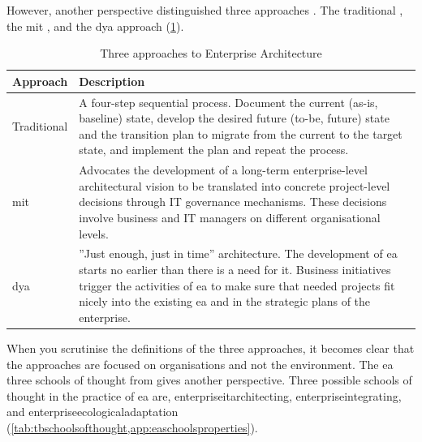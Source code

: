 However, another perspective distinguished three approaches \parencite[p.~4071]{Kotusev2015}. The traditional \parencite{Spewak1993}, the \acrfull{mit} \parencite{Ross2014}, and the \acrfull{dya} \parencite{Wagter2005} approach \parencite[pp.~4071--4072]{Kotusev2015} (\cref{tab:tbthreeapproaches}).
\begin{longtable}{p{}p{}}
	\toprule%
	\textbf{Approach} & \textbf{Description} \\%
	\midrule%
	\endhead%
	\hline
	\endfoot%
	\caption[Three approaches to Enterprise Architecture \parencite{Kotusev2015}]{Three approaches to Enterprise Architecture \parencite{Kotusev2015}}
	\label{tab:tbthreeapproaches}
	\endlastfoot%
	Traditional & A four-step sequential process. Document the current (as-is, baseline) state, develop the desired future (to-be, future) state and the transition plan to migrate from the current to the target state, and implement the plan and repeat the process. \\%
	\acrshort{mit} & Advocates the development of a long-term enterprise-level architectural vision to be translated into concrete project-level decisions through IT governance mechanisms. These decisions involve business and IT managers on different organisational levels. \\%
	\acrshort{dya} & ''Just enough, just in time'' architecture. The development of \gls{ea} starts no earlier than there is a need for it. Business initiatives trigger the activities of 
	\gls{ea} to make sure that needed projects fit nicely into the existing \gls{ea} and in the strategic plans of the enterprise. \\%
	\bottomrule%
\end{longtable}
When you scrutinise the definitions of the three approaches, it becomes clear that the approaches are focused on organisations and not the environment. The \gls{ea} three schools of thought from \textcite{Lapalme2012} gives another perspective. Three possible schools of thought in the practice of \gls{ea} are, \gls{enterpriseitarchitecting}, \gls{enterpriseintegrating}, and \gls{enterpriseecologicaladaptation} \parencite[pp.~38--41]{Lapalme2012} (\cref{tab:tbschoolsofthought,app:easchoolsproperties}).
